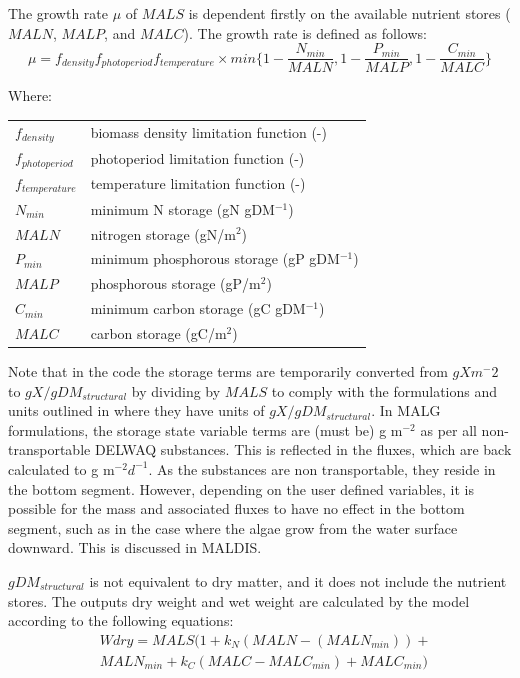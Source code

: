 \documentclass{deltares_manual}
\begin{document}
The growth rate $\mu$ of $MALS$ is dependent firstly on the available nutrient stores ($MALN$, $MALP$, and $MALC$). The growth rate is defined as follows:
\begin{equation}
	\mu = f_{density} f_{photoperiod} f_{temperature}\times min\big\{1-\frac{N_{min}}{MALN},1-\frac{P_{min}}{MALP},1-\frac{C_{min}}{MALC}\big\}
\end{equation}

Where:\\

\begin{tabular}{ll}
$f_{density}$ & biomass density limitation function (-)\\
$f_{photoperiod}$ & photoperiod limitation function (-)\\
$f_{temperature}$ & temperature limitation function (-)\\
$N_{min}$ & minimum N storage (gN gDM$^{-1}$)\\
$MALN$ & nitrogen storage (gN/m$^2$)\\
$P_{min}$ & minimum phosphorous storage (gP gDM$^{-1}$)\\
$MALP$ & phosphorous storage (gP/m$^2$)\\
$C_{min}$ & minimum carbon storage (gC gDM$^{-1}$)\\
$MALC$ & carbon storage (gC/m$^2$)\\
\end{tabular}

Note that in the code the storage terms are temporarily converted from $gX m{^-2}$ to $gX/gDM_{structural}$ by dividing by $MALS$ to comply with the formulations and units outlined in \cite{broch2012} where they have units of $gX/gDM_{structural}$. In MALG formulations, the storage state variable terms are (must be) g m$^{-2}$ as per all non-transportable DELWAQ substances. This is reflected in the fluxes, which are back calculated to g m$^{-2}d^{-1}$. As the substances are non transportable, they reside in the bottom segment. However, depending on the user defined variables, it is possible for the mass and associated fluxes to have no effect in the bottom segment, such as in the case where the algae grow from the water surface downward. This is discussed in MALDIS.

$gDM_{structural}$ is not equivalent to dry matter, and it does not include the nutrient stores. The outputs dry weight and wet weight are calculated by the model according to the following equations:
\begin{equation}
\begin{aligned}
&Wdry = MALS(1 + k_N(MALN - (MALN_{min})) + \\
&MALN_{min} + k_C(MALC - MALC_{min})+ MALC_{min})
\end{aligned}
\end{equation}
\end{document}
